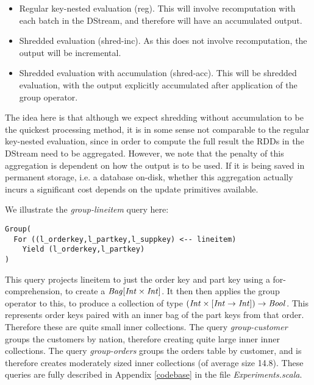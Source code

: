\begin{itemize}
\item{Regular key-nested evaluation (reg). This will involve recomputation with each batch in the DStream, and therefore will have an accumulated output.}
\item{Shredded evaluation (shred-inc). As this does not involve recomputation, the output will be incremental.}
\item{Shredded evaluation with accumulation (shred-acc). This will be shredded evaluation, with the output explicitly accumulated after application of the group operator.}
\end{itemize}

The idea here is that although we expect shredding without accumulation to be the quickest processing method, it is in some sense not comparable to the regular key-nested evaluation, since in order to compute the full result the RDDs in the DStream need to be aggregated. However, we note that the penalty of this aggregation is dependent on how the output is to be used. If it is being saved in permanent storage, i.e. a database on-disk, whether this aggregation actually incurs a significant cost depends on the update primitives available.

We illustrate the \textit{group-lineitem} query here:
\vs\begin{lstlisting}
Group(
  For ((l_orderkey,l_partkey,l_suppkey) <-- lineitem)
    Yield (l_orderkey,l_partkey)
)
\end{lstlisting}\vs

This query projects lineitem to just the order key and part key using a for-comprehension, to create a $\textrm{\textit{Bag}}[\textrm{\textit{Int}} \times \textrm{\textit{Int}}]$. It then then applies the group operator to this, to produce a collection of type $(\textrm{\textit{Int}} \times [\textrm{\textit{Int}} \rightarrow \textrm{\textit{Int}}]) \rightarrow \textrm{\textit{Bool}}$. This represents order keys paired with an inner bag of the part keys from that order. Therefore these are quite small inner collections.
The query \textit{group-customer} groups the customers by nation, therefore creating quite large inner inner collections. The query \textit{group-orders} groups the orders table by customer, and is therefore creates moderately sized inner collections (of average size 14.8). These queries are fully described in Appendix \ref{codebase} in the file \textit{Experiments.scala}.

